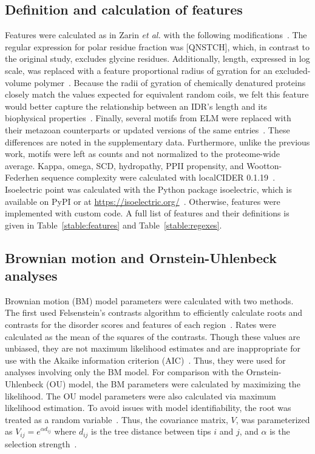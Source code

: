 \subsection{Definition and calculation of features}
Features were calculated as in Zarin \textit{et al.} with the following modifications~\cite{Zarin2019}. The regular expression for polar residue fraction was [QNSTCH], which, in contrast to the original study, excludes glycine residues. Additionally, length, expressed in log scale, was replaced with a feature proportional radius of gyration for an excluded-volume polymer~\cite{Flory1949}. Because the radii of gyration of chemically denatured proteins closely match the values expected for equivalent random coils, we felt this feature would better capture the relationship between an IDR's length and its biophysical properties~\cite{Kohn2004}. Finally, several motifs from ELM were replaced with their metazoan counterparts or updated versions of the same entries~\cite{Kumar2021}. These differences are noted in the supplementary data. Furthermore, unlike the previous work, motifs were left as counts and not normalized to the proteome-wide average. Kappa, omega, SCD, hydropathy, PPII propensity, and Wootton-Federhen sequence complexity were calculated with localCIDER 0.1.19~\cite{Holehouse2017}. Isoelectric point was calculated with the Python package isoelectric, which is available on PyPI or at \url{https://isoelectric.org/}~\cite{Kozlowski2016}. Otherwise, features were implemented with custom code. A full list of features and their definitions is given in Table~\ref{stable:features} and Table~\ref{stable:regexes}.

\subsection{Brownian motion and Ornstein-Uhlenbeck analyses}
Brownian motion (BM) model parameters were calculated with two methods. The first used Felsenstein's contrasts algorithm to efficiently calculate roots and contrasts for the disorder scores and features of each region~\cite{Felsenstein1973, Felsenstein1981}. Rates were calculated as the mean of the squares of the contrasts. Though these values are unbiased, they are not maximum likelihood estimates and are inappropriate for use with the Akaike information criterion (AIC)~\cite{Akaike1974}. Thus, they were used for analyses involving only the BM model. For comparison with the Ornstein-Uhlenbeck (OU) model, the BM parameters were calculated by maximizing the likelihood. The OU model parameters were also calculated via maximum likelihood estimation. To avoid issues with model identifiability, the root was treated as a random variable~\cite{Ho2014}. Thus, the covariance matrix, $V$, was parameterized as $V_{ij} = e^{\alpha d_{ij}}$ where $d_{ij}$ is the tree distance between tips $i$ and $j$, and $\alpha$ is the selection strength~\cite{An2008}.


